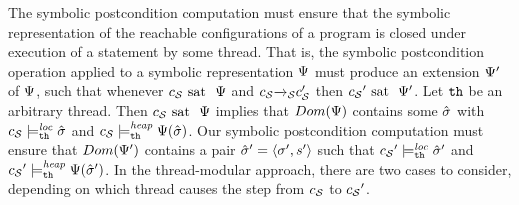 The symbolic postcondition computation must ensure that the symbolic
representation
of the reachable configurations of a program is closed under execution of a
statement by some thread. That is, 
the symbolic postcondition operation applied to a symbolic representation
$\Psi$ must produce an extension $\Psi'$
of $\Psi$, such that whenever $c_{\mathcal S} \mbox{ sat \ } \Psi$
and $c_{\mathcal S}{\xrightarrow{}{}}_{\!\!{\mathcal S}}c_{\mathcal S}'$ then
${c_{\mathcal S}}' \mbox{ sat \ } \Psi'$.
Let ${\tt th}$ be an arbitrary thread. Then $c_{\mathcal S} \mbox{ sat \ } \Psi$
implies that $Dom(\Psi)$ contains some
$\hat{\sigma}$ with
$c_{\mathcal S} \models_{{\tt th}}^{\mathit{loc}} \hat{\sigma}$ and
$c_{\mathcal S} \models_{{\tt th}}^{\mathit{heap}} \Psi(\hat{\sigma})$. Our
symbolic postcondition computation must ensure that
$Dom(\Psi')$ contains a pair
$\hat{\sigma}' = \left\langle\sigma',s'\right\rangle$ such that
${c_{\mathcal S}}' \models_{{\tt th}}^{\mathit{loc}} \hat{\sigma}'$ and
${c_{\mathcal S}}' \models_{{\tt th}}^{\mathit{heap}} \Psi(\hat{\sigma}')$.
In the thread-modular approach, there are two cases to consider, depending
on which thread causes the step from $c_{\mathcal S}$ to ${c_{\mathcal S}}'$.
